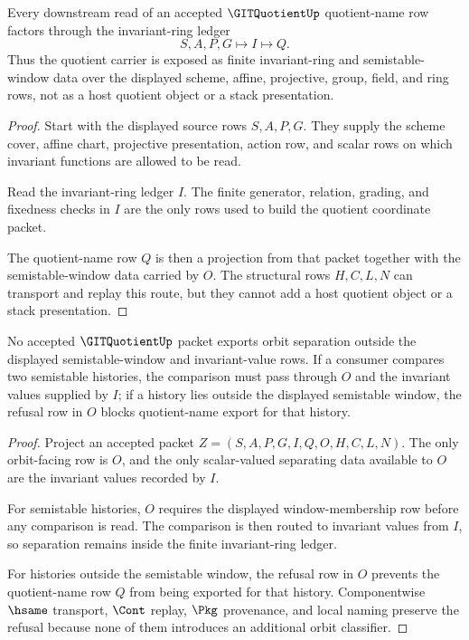 \begin{theorem}
\label{thm:git-quotient-invariant-ring-handoff}
Every downstream read of an accepted $\GITQuotientUp$ quotient-name row factors through the invariant-ring ledger
$$
S,A,P,G \longmapsto I \longmapsto Q .
$$
Thus the quotient carrier is exposed as finite invariant-ring and semistable-window data over the displayed scheme, affine, projective, group, field, and ring rows, not as a host quotient object or a stack presentation.
\end{theorem}
\begin{proof}
Start with the displayed source rows $S,A,P,G$. They supply the scheme cover, affine chart, projective presentation, action row, and scalar rows on which invariant functions are allowed to be read.

Read the invariant-ring ledger $I$. The finite generator, relation, grading, and fixedness checks in $I$ are the only rows used to build the quotient coordinate packet.

The quotient-name row $Q$ is then a projection from that packet together with the semistable-window data carried by $O$. The structural rows $H,C,L,N$ can transport and replay this route, but they cannot add a host quotient object or a stack presentation.
\end{proof}

\begin{theorem}
\label{thm:git-quotient-orbit-separation-nonescape}
No accepted $\GITQuotientUp$ packet exports orbit separation outside the displayed semistable-window and invariant-value rows. If a consumer compares two semistable histories, the comparison must pass through $O$ and the invariant values supplied by $I$; if a history lies outside the displayed semistable window, the refusal row in $O$ blocks quotient-name export for that history.
\end{theorem}
\begin{proof}
Project an accepted packet $Z=(S,A,P,G,I,Q,O,H,C,L,N)$. The only orbit-facing row is $O$, and the only scalar-valued separating data available to $O$ are the invariant values recorded by $I$.

For semistable histories, $O$ requires the displayed window-membership row before any comparison is read. The comparison is then routed to invariant values from $I$, so separation remains inside the finite invariant-ring ledger.

For histories outside the semistable window, the refusal row in $O$ prevents the quotient-name row $Q$ from being exported for that history. Componentwise $\hsame$ transport, $\Cont$ replay, $\Pkg$ provenance, and local naming preserve the refusal because none of them introduces an additional orbit classifier.
\end{proof}

